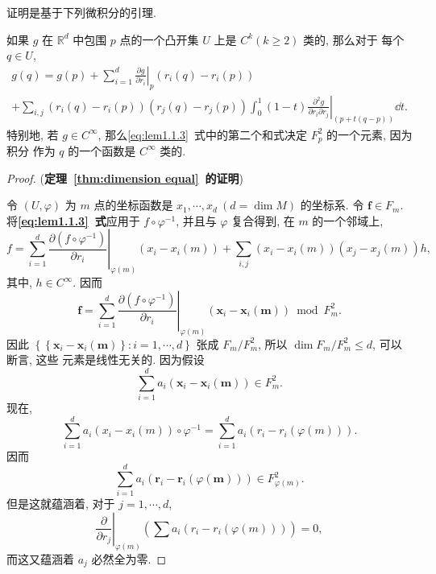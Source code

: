 证明是基于下列微积分的引理.
\begin{lem}
如果 $g$ 在 $\mathbb{R}^d$ 中包围 $p$ 点的一个凸开集 $U$ 上是 $C^k(k \geqslant 2)$ 类的, 那么对于 每个 $q \in U$,
\begin{multline}\label{eq:lem1.1.3}
g(q)= g(p)+\left.\sum_{i=1}^d \frac{\partial g}{\partial r_i}\right|_p\left(r_i(q)-r_i(p)\right) \\
 +\left.\sum_{i, j}\left(r_i(q)-r_i(p)\right)\left(r_j(q)-r_j(p)\right) \int_0^1(1-t) \frac{\partial^2 g}{\partial r_i \partial r_j}\right|_{(p+t(q-p))} \dd t .
\end{multline}
特别地, 若 $g \in C^{\infty}$, 那么\eqref{eq:lem1.1.3}~式中的第二个和式决定 $F_p^2$ 的一个元素, 因为积分 作为 $q$ 的一个函数是 $C^{\infty}$ 类的.
\end{lem}
\begin{proof}{(\textbf{定理~\ref{thm:dimension equal}~的证明})}

令 $(U, \varphi)$ 为 $m$ 点的坐标函数是 $x_1, \cdots, x_d ~(d=\dim M)$ 的坐标系. 令 $\mathbf{f} \in F_m$. 将\textbf{\eqref{eq:lem1.1.3}~式}应用于 $f \circ \varphi^{-1}$, 并且与 $\varphi$ 复合得到, 在 $m$ 的一个邻域上,
$$
f=\left.\sum_{i=1}^d \frac{\partial\left(f \circ \varphi^{-1}\right)}{\partial r_i}\right|_{\varphi(m)}\left(x_i-x_i(m)\right)+\sum_{i, j}\left(x_i-x_i(m)\right)\left(x_j-x_j(m)\right) h,
$$
其中, $h \in C^{\infty}$. 因而
$$
\mathbf{f}=\left.\sum_{i=1}^d \frac{\partial\left(f \circ \varphi^{-1}\right)}{\partial r_i}\right|_{\varphi(m)}\left(\mathbf{x}_i-\mathbf{x}_i(\mathbf{m})\right) \bmod F_m^2 .
$$
因此 $\left\{\left\{\mathbf{x}_i-\mathbf{x}_i(\mathbf{m})\right\}: i=1, \cdots, d\right\}$ 张成 $F_m / F_m^2$, 所以 $\operatorname{dim} F_m / F_m^2 \leqslant d$, 可以断言, 这些 元素是线性无关的. 因为假设
$$
\sum_{i=1}^d a_i\left(\mathbf{x}_i-\mathbf{x}_i(\mathbf{m})\right) \in F_m^2 .
$$
现在,
$$
\sum_{i=1}^d a_i\left(x_i-x_i(m)\right) \circ \varphi^{-1}=\sum_{i=1}^d a_i\left(r_i-r_i(\varphi(m))\right) .
$$
因而
$$
\sum_{i=1}^d a_i\left(\mathbf{r}_i-\mathbf{r}_i(\varphi(\mathbf{m}))\right) \in F_{\varphi(m)}^2 .
$$
但是这就蕴涵着, 对于 $j=1, \cdots, d$,
$$
\left.\frac{\partial}{\partial r_j}\right|_{\varphi(m)}\left(\sum a_i\left(r_i-r_i(\varphi(m))\right)\right)=0,
$$
而这又蕴涵着 $a_j$ 必然全为零.
\end{proof}

